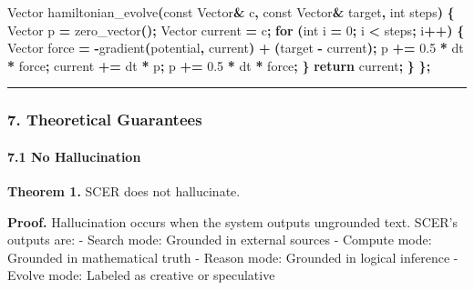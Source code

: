\documentclass[
  11pt,
  a4paper,
]{article}
\newenvironment{Shaded}{\begin{snugshade}}{\end{snugshade}}
\newcommand{\AttributeTok}[1]{\textcolor[rgb]{0.13,0.29,0.53}{#1}}
\newcommand{\ControlFlowTok}[1]{\textcolor[rgb]{0.13,0.29,0.53}{\textbf{#1}}}
\newcommand{\DataTypeTok}[1]{\textcolor[rgb]{0.13,0.29,0.53}{#1}}
\newcommand{\DecValTok}[1]{\textcolor[rgb]{0.00,0.00,0.81}{#1}}
\newcommand{\FloatTok}[1]{\textcolor[rgb]{0.00,0.00,0.81}{#1}}
\newcommand{\NormalTok}[1]{#1}
\newcommand{\OperatorTok}[1]{\textcolor[rgb]{0.81,0.36,0.00}{\textbf{#1}}}
\begin{document}
\begin{Shaded}
\begin{Highlighting}[]
\NormalTok{    Vector hamiltonian\_evolve}\OperatorTok{(}\AttributeTok{const}\NormalTok{ Vector}\OperatorTok{\&}\NormalTok{ c}\OperatorTok{,} \AttributeTok{const}\NormalTok{ Vector}\OperatorTok{\&}\NormalTok{ target}\OperatorTok{,} \DataTypeTok{int}\NormalTok{ steps}\OperatorTok{)} \OperatorTok{\{}
\NormalTok{        Vector p }\OperatorTok{=}\NormalTok{ zero\_vector}\OperatorTok{();}
\NormalTok{        Vector current }\OperatorTok{=}\NormalTok{ c}\OperatorTok{;}
        \ControlFlowTok{for} \OperatorTok{(}\DataTypeTok{int}\NormalTok{ i }\OperatorTok{=} \DecValTok{0}\OperatorTok{;}\NormalTok{ i }\OperatorTok{\textless{}}\NormalTok{ steps}\OperatorTok{;}\NormalTok{ i}\OperatorTok{++)} \OperatorTok{\{}
\NormalTok{            Vector force }\OperatorTok{=} \OperatorTok{{-}}\NormalTok{gradient}\OperatorTok{(}\NormalTok{potential}\OperatorTok{,}\NormalTok{ current}\OperatorTok{)} \OperatorTok{+} \OperatorTok{(}\NormalTok{target }\OperatorTok{{-}}\NormalTok{ current}\OperatorTok{);}
\NormalTok{            p }\OperatorTok{+=} \FloatTok{0.5} \OperatorTok{*}\NormalTok{ dt }\OperatorTok{*}\NormalTok{ force}\OperatorTok{;}
\NormalTok{            current }\OperatorTok{+=}\NormalTok{ dt }\OperatorTok{*}\NormalTok{ p}\OperatorTok{;}
\NormalTok{            p }\OperatorTok{+=} \FloatTok{0.5} \OperatorTok{*}\NormalTok{ dt }\OperatorTok{*}\NormalTok{ force}\OperatorTok{;}
        \OperatorTok{\}}
        \ControlFlowTok{return}\NormalTok{ current}\OperatorTok{;}
    \OperatorTok{\}}
\OperatorTok{\};}
\end{Highlighting}
\end{Shaded}

\begin{center}\rule{0.5\linewidth}{0.5pt}\end{center}

\subsubsection{7. Theoretical
Guarantees}\label{theoretical-guarantees-3}

\paragraph{7.1 No Hallucination}\label{no-hallucination-2}

\textbf{Theorem 1.} SCER does not hallucinate.

\textbf{Proof.} Hallucination occurs when the system outputs ungrounded
text. SCER's outputs are: - Search mode: Grounded in external sources -
Compute mode: Grounded in mathematical truth - Reason mode: Grounded in
logical inference - Evolve mode: Labeled as creative or speculative
\end{document}
